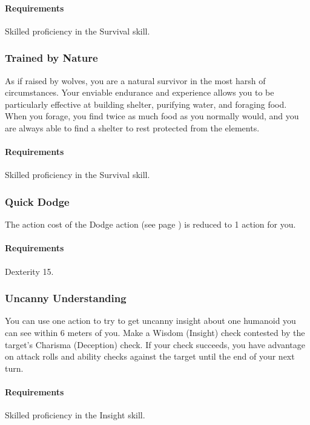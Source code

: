     \paragraph{Requirements} Skilled proficiency in the Survival skill.
\subsubsection{Trained by Nature} \label{feat::trainedbynature}
    As if raised by wolves, you are a natural survivor in the most harsh of circumstances.
    Your enviable endurance and experience allows you to be particularly effective at building shelter, purifying water, and foraging food.
    When you forage, you find twice as much food as you normally would, and you are always able to find a shelter to rest protected from the elements.
    \paragraph{Requirements} Skilled proficiency in the Survival skill.
\subsubsection{Quick Dodge} \label{feat::quickdodge}
    The action cost of the Dodge action (see page \pageref{act::dodge}) is reduced to 1 action for you.
    \paragraph{Requirements} Dexterity 15.
\subsubsection{Uncanny Understanding} \label{feat::uncannyinsight}
    You can use one action to try to get uncanny insight about one humanoid you can see within 6 meters of you.
    Make a Wisdom (Insight) check contested by the target's Charisma (Deception) check.
    If your check succeeds, you have advantage on attack rolls and ability checks against the target until the end of your next turn.
    \paragraph{Requirements} Skilled proficiency in the Insight skill.
